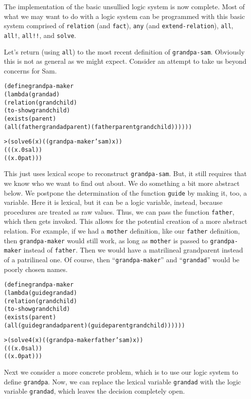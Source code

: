 The implementation of the basic unsullied logic system is now
complete.  Most of what we may want to do with a logic system can be
programmed with this basic system comprised of \texttt{relation} (and
\texttt{fact}), \texttt{any} (and \texttt{extend-relation}),
\texttt{all}, \texttt{all!}, \texttt{all!!}, and \texttt{solve}.

Let's return (using \texttt{all}) to the most recent definition of
\texttt{grandpa-sam}.  Obviously this is not as general as we might
expect.  Consider an attempt to take us beyond concerns for Sam.

\begin{alltt}
(define grandpa-maker
  (lambda (grandad)
    (relation (grandchild)
      (to-show grandchild)
      (exists (parent)
        (all (father grandad parent) (father parent grandchild))))))

> (solve 6 (x) ((grandpa-maker 'sam) x))
(((x.0 sal))
 ((x.0 pat)))
\end{alltt}

\noindent
This just uses lexical scope to reconstruct \texttt{grandpa-sam}.
But, it still requires that we know who we want to find out about. We
do something a bit more abstract below.  We postpone the
determination of the function \texttt{guide} by making it, too, a
variable. Here it is lexical, but it can be a logic variable, instead,
because procedures are treated as raw values.  Thus, we can pass the function
\texttt{father}, which then gets invoked.  This allows for the
potential creation of a more abstract relation.  For example, if we
had a \texttt{mother} definition, like our \texttt{father} definition,
then \texttt{grandpa-maker} would still work, as long as
\texttt{mother} is passed to \texttt{grandpa-maker} instead of
\texttt{father}.  Then we would have a matrilineal grandparent instead
of a patrilineal one.  Of course, then ``\texttt{grandpa-maker}'' and
``\texttt{grandad}'' would be poorly chosen names.

\begin{alltt}
(define grandpa-maker
  (lambda (guide grandad)
    (relation (grandchild)
      (to-show grandchild)
      (exists (parent)
        (all (guide grandad parent) (guide parent grandchild))))))

> (solve 4 (x) ((grandpa-maker father 'sam) x))
(((x.0 sal))
 ((x.0 pat)))
\end{alltt}

Next we consider a more concrete problem, which is to use our logic
system to define \texttt{grandpa}.  Now, we can replace the lexical
variable \texttt{grandad} with the logic variable \texttt{grandad},
which leaves the decision completely open.

